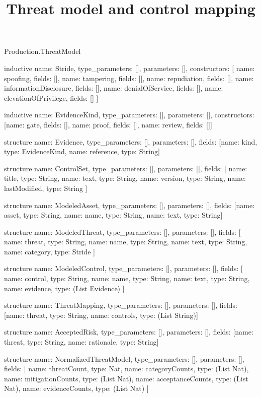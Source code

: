 \begin{lexlean}{Production.ThreatModel}
\title{Threat model and control mapping}
\begin{semanticmodule}
inductive{
  name: Stride,
  type_parameters: [],
  parameters: [],
  constructors: [
    {name: spoofing, fields: []},
    {name: tampering, fields: []},
    {name: repudiation, fields: []},
    {name: informationDisclosure, fields: []},
    {name: denialOfService, fields: []},
    {name: elevationOfPrivilege, fields: []}
  ]
}

inductive{
  name: EvidenceKind,
  type_parameters: [],
  parameters: [],
  constructors: [{name: gate, fields: []}, {name: proof, fields: []}, {name: review, fields: []}]
}

structure{
  name: Evidence,
  type_parameters: [],
  parameters: [],
  fields: [{name: kind, type: EvidenceKind}, {name: reference, type: String}]
}

structure{
  name: ControlSet,
  type_parameters: [],
  parameters: [],
  fields: [
    {name: title, type: String},
    {name: text, type: String},
    {name: version, type: String},
    {name: lastModified, type: String}
  ]
}

structure{
  name: ModeledAsset,
  type_parameters: [],
  parameters: [],
  fields: [{name: asset, type: String}, {name: name, type: String}, {name: text, type: String}]
}

structure{
  name: ModeledThreat,
  type_parameters: [],
  parameters: [],
  fields: [
    {name: threat, type: String},
    {name: name, type: String},
    {name: text, type: String},
    {name: category, type: Stride}
  ]
}

structure{
  name: ModeledControl,
  type_parameters: [],
  parameters: [],
  fields: [
    {name: control, type: String},
    {name: name, type: String},
    {name: text, type: String},
    {name: evidence, type: (List Evidence)}
  ]
}

structure{
  name: ThreatMapping,
  type_parameters: [],
  parameters: [],
  fields: [{name: threat, type: String}, {name: controls, type: (List String)}]
}

structure{
  name: AcceptedRisk,
  type_parameters: [],
  parameters: [],
  fields: [{name: threat, type: String}, {name: rationale, type: String}]
}

structure{
  name: NormalizedThreatModel,
  type_parameters: [],
  parameters: [],
  fields: [
    {name: threatCount, type: Nat},
    {name: categoryCounts, type: (List Nat)},
    {name: mitigationCounts, type: (List Nat)},
    {name: acceptanceCounts, type: (List Nat)},
    {name: evidenceCounts, type: (List Nat)}
  ]
}


\end{semanticmodule}
\end{lexlean}
